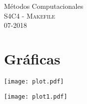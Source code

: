 \documentclass[11pt,letterpaper]{exam}
\begin{document}
\begin{center}
{\Large Métodos Computacionales} \\
S4C4 - \textsc{Makefile}\\
07-2018\\
\end{center}


\noindent
\section{Gr\'aficas}
\begin{center}
\texttt{[image: plot.pdf]} 
\begin{center}
\end{center}
\texttt{[image: plot1.pdf]} 
\end{center}
\end{document}
